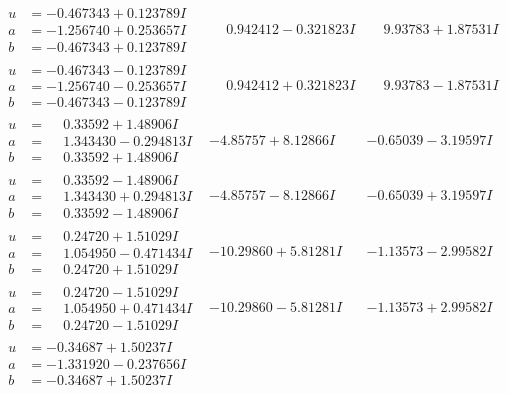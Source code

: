 \documentclass[1p]{elsarticle_modified}
\theoremstyle{definition}
\begin{document}
$$\begin{array}{c|c|c}
\begin{aligned}
u &= -0.467343 + 0.123789 I \\
a &= -1.256740 + 0.253657 I \\
b &= -0.467343 + 0.123789 I\end{aligned}
 & \phantom{-}0.942412 - 0.321823 I & \phantom{-}9.93783 + 1.87531 I \\ \hline\begin{aligned}
u &= -0.467343 - 0.123789 I \\
a &= -1.256740 - 0.253657 I \\
b &= -0.467343 - 0.123789 I\end{aligned}
 & \phantom{-}0.942412 + 0.321823 I & \phantom{-}9.93783 - 1.87531 I \\ \hline\begin{aligned}
u &= \phantom{-}0.33592 + 1.48906 I \\
a &= \phantom{-}1.343430 - 0.294813 I \\
b &= \phantom{-}0.33592 + 1.48906 I\end{aligned}
 & -4.85757 + 8.12866 I & -0.65039 - 3.19597 I \\ \hline\begin{aligned}
u &= \phantom{-}0.33592 - 1.48906 I \\
a &= \phantom{-}1.343430 + 0.294813 I \\
b &= \phantom{-}0.33592 - 1.48906 I\end{aligned}
 & -4.85757 - 8.12866 I & -0.65039 + 3.19597 I \\ \hline\begin{aligned}
u &= \phantom{-}0.24720 + 1.51029 I \\
a &= \phantom{-}1.054950 - 0.471434 I \\
b &= \phantom{-}0.24720 + 1.51029 I\end{aligned}
 & -10.29860 + 5.81281 I & -1.13573 - 2.99582 I \\ \hline\begin{aligned}
u &= \phantom{-}0.24720 - 1.51029 I \\
a &= \phantom{-}1.054950 + 0.471434 I \\
b &= \phantom{-}0.24720 - 1.51029 I\end{aligned}
 & -10.29860 - 5.81281 I & -1.13573 + 2.99582 I \\ \hline\begin{aligned}
u &= -0.34687 + 1.50237 I \\
a &= -1.331920 - 0.237656 I \\
b &= -0.34687 + 1.50237 I\end{aligned}

\end{array}$$
\end{document}
